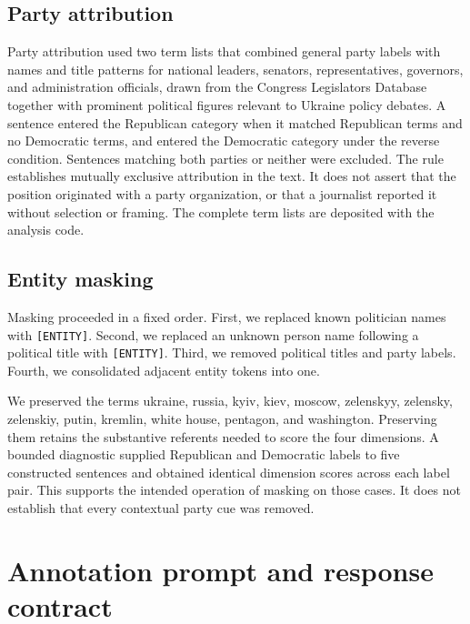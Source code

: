 \subsection*{Party attribution}

Party attribution used two term lists that combined general party labels with names and title patterns for national leaders, senators, representatives, governors, and administration officials, drawn from the Congress Legislators Database together with prominent political figures relevant to Ukraine policy debates. A sentence entered the Republican category when it matched Republican terms and no Democratic terms, and entered the Democratic category under the reverse condition. Sentences matching both parties or neither were excluded. The rule establishes mutually exclusive attribution in the text. It does not assert that the position originated with a party organization, or that a journalist reported it without selection or framing. The complete term lists are deposited with the analysis code.

\subsection*{Entity masking}

Masking proceeded in a fixed order. First, we replaced known politician names with \texttt{[ENTITY]}. Second, we replaced an unknown person name following a political title with \texttt{[ENTITY]}. Third, we removed political titles and party labels. Fourth, we consolidated adjacent entity tokens into one.

We preserved the terms ukraine, russia, kyiv, kiev, moscow, zelenskyy, zelensky, zelenskiy, putin, kremlin, white house, pentagon, and washington. Preserving them retains the substantive referents needed to score the four dimensions. A bounded diagnostic supplied Republican and Democratic labels to five constructed sentences and obtained identical dimension scores across each label pair. This supports the intended operation of masking on those cases. It does not establish that every contextual party cue was removed.

\section{Annotation prompt and response contract}

